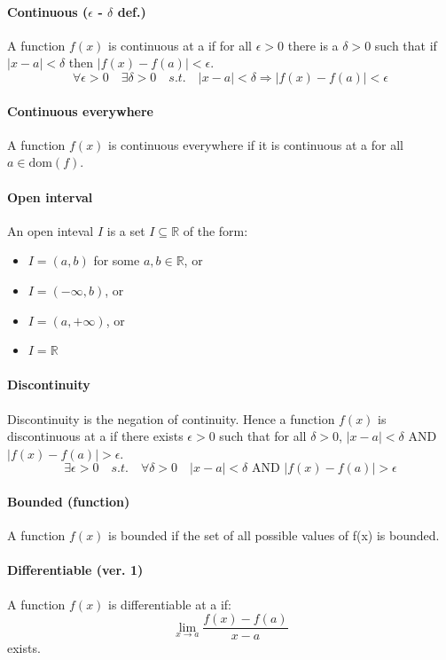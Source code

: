 \documentclass{scrartcl}
\newcommand{\R}{\mathbb{R}}
\begin{document}
\paragraph{Continuous ($ \epsilon $ - $ \delta $ def.)}
A function $ f(x) $ is continuous at a if for all $ \epsilon > 0 $ there is a $ \delta > 0 $ such that if $ |x - a| < \delta $ then $ |f(x) - f(a)| < \epsilon $.
\begin{equation}
\forall \epsilon > 0 \quad \exists \delta > 0 \quad s.t. \quad |x - a| < \delta \Rightarrow |f(x) - f(a)| < \epsilon
\end{equation}
\paragraph{Continuous everywhere}
A function $ f(x) $ is continuous everywhere if it is continuous at a for all $ a \in \textrm{dom}(f) $.
\paragraph{Open interval}
An open inteval $ I $ is a set $ I \subseteq \R $ of the form:
\begin{itemize}
\item $ I = (a, b) $ for some $ a, b \in \R $, or
\item $ I = (-\infty, b) $, or
\item $ I = (a, +\infty) $, or
\item $ I = \R $
\end{itemize}
\paragraph{Discontinuity}
Discontinuity is the negation of continuity. Hence a function $ f(x) $ is discontinuous at a if there exists $ \epsilon > 0 $ such that for all $ \delta > 0 $, $ |x - a| < \delta $ AND $ |f(x) - f(a)| > \epsilon $.
\begin{equation}
\exists \epsilon > 0 \quad s.t. \quad \forall \delta > 0 \quad |x - a| < \delta \textrm{ AND } |f(x) - f(a)| > \epsilon
\end{equation}
\paragraph{Bounded (function)}
A function $ f(x) $ is bounded if the set of all possible values of f(x) is bounded.
\paragraph{Differentiable (ver. 1)}
A function $ f(x) $ is differentiable at a if:
\begin{equation}
\lim_{x \to a}\frac{f(x) - f(a)}{x - a}
\end{equation}
exists.
\end{document}
